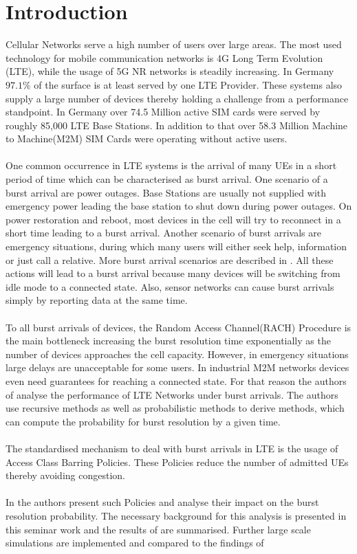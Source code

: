\documentclass[conference]{IEEEtran}
\begin{document}
\section{Introduction}
Cellular Networks serve a high number of users over large areas.
The most used technology for mobile communication networks is 4G Long Term Evolution (LTE), while the usage of 5G NR networks is steadily increasing.
In Germany $97.1\%$ of the surface is at least served by one LTE Provider\cite{bundesnetzagentur}.
These systems also supply a large number of devices thereby holding a challenge from a performance standpoint.
In Germany over 74.5 Million active SIM cards were served by roughly 85,000 LTE Base Stations\cite{bundesnetzagentur}.
In addition to that over 58.3 Million Machine to Machine(M2M) SIM Cards were operating without active users\cite{bundesnetzagentur}.\\\\
One common occurrence in LTE systems is the arrival of many UEs in a short period of time which can be characterised as burst arrival.
One scenario of a burst arrival are power outages.
Base Stations are usually not supplied with emergency power leading the base station to shut down during power outages.
On power restoration and reboot, most devices in the cell will try to reconnect in a short time leading to a burst arrival.
Another scenario of burst arrivals are emergency situations, during which many users will either seek help, information or just call a relative.
More burst arrival scenarios are described in \cite{3GPP_TR_37.868}.
All these actions will lead to a burst arrival because many devices will be switching from idle mode to a connected state.
Also, sensor networks can cause burst arrivals simply by reporting data at the same time.\\\\
To all burst arrivals of devices, the Random Access Channel(RACH) Procedure is the main bottleneck increasing the burst resolution time exponentially as the number of devices approaches the cell capacity.
However, in emergency situations large delays are unacceptable for some users.
In industrial M2M networks devices even need guarantees for reaching a connected state.
For that reason the authors of \cite{8422323} analyse the performance of LTE Networks under burst arrivals.
The authors use recursive methods as well as probabilistic methods to derive methods, which can compute the probability for burst resolution by a given time.\\\\
The standardised mechanism to deal with burst arrivals in LTE is the usage of Access Class Barring Policies.
These Policies reduce the number of admitted UEs thereby avoiding congestion.\\\\
In \cite{8422323} the authors present such Policies and analyse their impact on the burst resolution probability.
The necessary background for this analysis is presented in this seminar work and the results of\cite{8422323} are summarised.
Further large scale simulations are implemented and compared to the findings of \cite{8422323}
\end{document}
